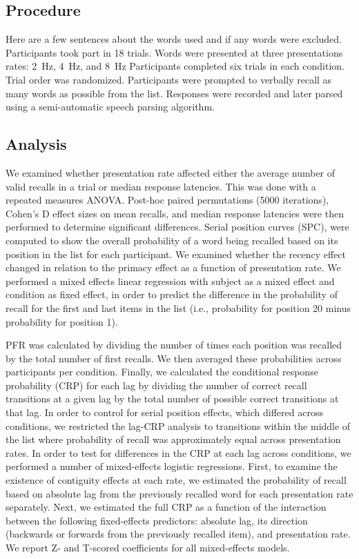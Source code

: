 \documentclass[10pt,letterpaper]{article}
\begin{document}
\subsection{Procedure}

Here are a few sentences about the words used and if any words were excluded.
Participants took part in 18 trials. Words were presented at three
presentations rates: 2~Hz, 4~Hz, and 8~Hz Participants completed six trials in
each condition. Trial order was randomized.  Participants were prompted to
verbally recall as many words as possible from the list. Responses were
recorded and later parsed using a semi-automatic speech parsing algorithm.

\subsection{Analysis}

We examined whether presentation rate affected either the average number of
valid recalls in a trial or median response latencies. This was done with a
repeated measures ANOVA. Post-hoc paired permutations (5000 iterations),
Cohen's D effect sizes on mean recalls, and median response latencies were then
performed to determine significant differences. Serial position curves (SPC),
were computed to show the overall probability of a word being recalled based
on its position in the list for each participant. We examined whether the recency
effect changed in relation to the primacy effect as a function of presentation
rate. We performed a mixed effects linear regression with subject as a mixed
effect and condition as fixed effect, in order to predict the difference in
the probability of recall for the first and last items in the list (i.e.,
probability for position 20 minus probability for position 1). 

PFR was calculated by dividing the number of times each position was recalled
by the total number of first recalls. We then averaged these probabilities
across participants per condition. Finally, we calculated the conditional
response probability (CRP) for each lag by dividing the number of correct
recall transitions at a given lag by the total number of possible correct
transitions at that lag. 
In order to control for serial position effects, which differed across
conditions, we restricted the lag-CRP analysis to transitions within the
middle of the list where probability of recall was approximately equal across
presentation rates.
In order to test for differences in the CRP at each
lag across conditions, we performed a number of mixed-effects logistic regressions. 
First, to examine the existence of contiguity effects at each rate,
we estimated the probability of recall based on absolute lag from the previously
recalled word for each presentation rate separately. Next, we estimated the full CRP as a function of the
interaction between the following fixed-effects predictors: absolute lag, its
direction (backwards or forwards from the previously recalled item), and 
presentation rate. We report Z- and T-scored coefficients for all
mixed-effects models.
\end{document}
